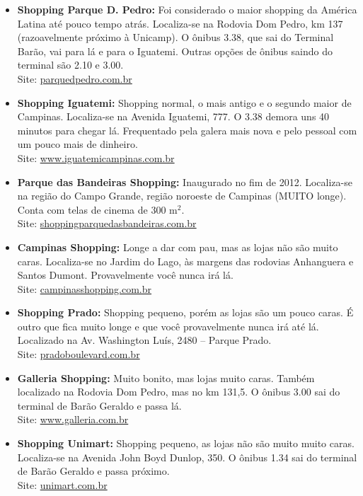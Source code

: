 \begin{itemize}
\item \textbf{Shopping Parque D. Pedro:} Foi considerado o maior shopping da
  América Latina até pouco tempo atrás. Localiza-se na Rodovia Dom Pedro, km
  137 (razoavelmente próximo à Unicamp). O ônibus 3.38, que sai do Terminal
  Barão, vai para lá e para o Iguatemi. Outras opções de ônibus saindo do
  terminal são 2.10 e 3.00.
  \\Site: \url{parquedpedro.com.br}

\item \textbf{Shopping Iguatemi:} Shopping normal, o mais antigo e o segundo
  maior de Campinas. Localiza-se na Avenida Iguatemi, 777. O 3.38 demora uns 40
  minutos para chegar lá. Frequentado pela galera mais nova e pelo pessoal com
  um pouco mais de dinheiro.
  \\Site: \url{www.iguatemicampinas.com.br}

\item \textbf{Parque das Bandeiras Shopping:} Inaugurado no fim de 2012.
  Localiza-se na região do Campo Grande, região noroeste de Campinas (MUITO
  longe). Conta com telas de cinema de 300 m$^{2}$.
  \\Site: \url{shoppingparquedasbandeiras.com.br}

\item \textbf{Campinas Shopping:} Longe a dar com pau, mas as lojas não são
  muito caras. Localiza-se no Jardim do Lago, às margens das rodovias
  Anhanguera e Santos Dumont. Provavelmente você nunca irá lá.
  \\Site: \url{campinasshopping.com.br}

\item \textbf{Shopping Prado:} Shopping pequeno, porém as lojas são um pouco
  caras. É outro que fica muito longe e que você provavelmente nunca irá até
  lá. Localizado na Av. Washington Luís, 2480 -- Parque Prado.
  \\Site: \url{pradoboulevard.com.br}

\item \textbf{Galleria Shopping:} Muito bonito, mas lojas mui\-to caras. Também
  localizado na Rodovia Dom Pedro, mas no km 131,5. O ônibus 3.00 sai do
  terminal de Barão Geraldo e passa lá.
  \\Site: \url{www.galleria.com.br}

\item \textbf{Shopping Unimart:} Shopping pequeno, as lojas não são muito muito
  caras. Localiza-se na Avenida John Boyd Dunlop, 350. O ônibus 1.34 sai do
  terminal de Barão Geraldo e passa próximo.
  \\Site: \url{unimart.com.br}


\end{itemize}
